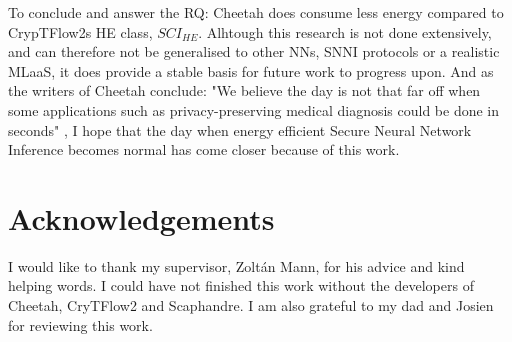 \documentclass[../thesis.tex]{subfiles}
\begin{document}
To conclude and answer the RQ: Cheetah does consume less energy compared to CrypTFlow2s HE class, $SCI_{HE}$. Alhtough this research is not done extensively, and can therefore not be generalised to other NNs, SNNI protocols or a realistic MLaaS, it does provide a stable basis for future work to progress upon. And as the writers of Cheetah conclude: "We believe the day
is not that far off when some applications such as privacy-preserving medical diagnosis could be done in seconds" \parencite[p. 821]{cheetah}, I hope that the day when energy efficient Secure Neural Network Inference becomes normal has come closer because of this work. 

\section{Acknowledgements}
I would like to thank my supervisor, Zolt\'an Mann, for his advice and kind helping words. I could have not finished this work without the developers of Cheetah, CryTFlow2 and Scaphandre. I am also grateful to my dad and Josien for reviewing this work. 
\end{document}
